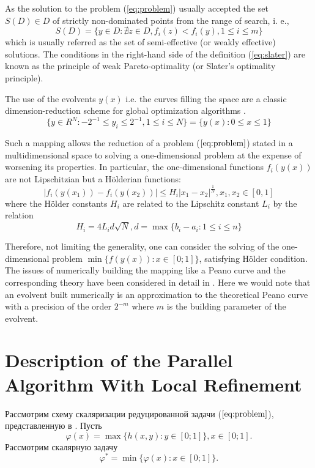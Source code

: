 \documentclass{llncs}
\begin{document}
As the solution to the problem (\ref{eq:problem}) usually accepted the set \(S(D)\in D\) of  strictly non-dominated points from the range of search, i. e.,
\begin{equation}
  \label{eq:slater}
  S(D) = \{y\in D: \nexists z\in D, f_i(z)<f_i(y),1\leqslant i \leqslant m\}
\end{equation}
which is usually referred as the set of semi-effective (or weakly effective) solutions. The conditions in the right-hand side of the definition (\ref{eq:slater}) are known as the principle of weak Pareto-optimality (or Slater's optimality principle).

The use of the evolvents \(y(x)\) i.e. the curves filling the space are a classic dimension-reduction scheme for global optimization algorithms \cite{evolvents2013}.
\begin{displaymath}
\label{cube}
\lbrace y\in R^N:-2^{-1}\leqslant y_i\leqslant 2^{-1},1\leqslant i\leqslant N\rbrace=\{y(x):0\leqslant x\leqslant 1\}
\end{displaymath}
\par
Such a mapping allows the reduction of a problem (\(\ref{eq:problem}\)) stated in a multidimensional space to solving a one-dimensional problem at the expense of worsening its properties.
In particular, the one-dimensional functions \(f_i(y(x))\) are not Lipschitzian but a Hölderian functions:
\begin{equation}
\label{eq:holder}
|f_i(y(x_1))-f_i(y(x_2))|\leqslant H_i{|x_1-x_2|}^{\frac{1}{N}},x_1,x_2\in[0,1]
\end{equation}
where the Hölder constants \(H_i\) are related to the Lipschitz constant \(L_i\) by the relation
\begin{displaymath}
H_i=4L_id\sqrt{N},d=\max\{b_i-a_i:1\leqslant i\leqslant n\}
\end{displaymath}
\par
Therefore, not limiting the generality, one can consider the solving of the
one-dimensional problem \(\min\{f(y(x)): x\in [0;1]\}\), satisfying Hölder condition. The issues of numerically building the mapping like a Peano curve and the corresponding theory have been considered in detail in \cite{evolvents2013}. Here we would note that an evolvent built numerically is an approximation to the theoretical Peano curve with a precision of the order \(2^{-m}\) where \(m\) is the building parameter of the evolvent.

\section{Description of the Parallel Algorithm With Local Refinement}
Рассмотрим схему скаляризации редуцированной задачи (\(\ref{eq:problem}\)), представленную в \cite{}. Пусть
\begin{equation}
  \varphi(x)=\max\{h(x,y):y\in [0;1]\},x\in [0;1].
\end{equation}
Рассмотрим скалярную задачу
\begin{equation}
  \label{eq:aux_problem}
  \varphi^*=\min\{\varphi(x):x\in [0;1]\}.
\end{equation}
\end{document}
